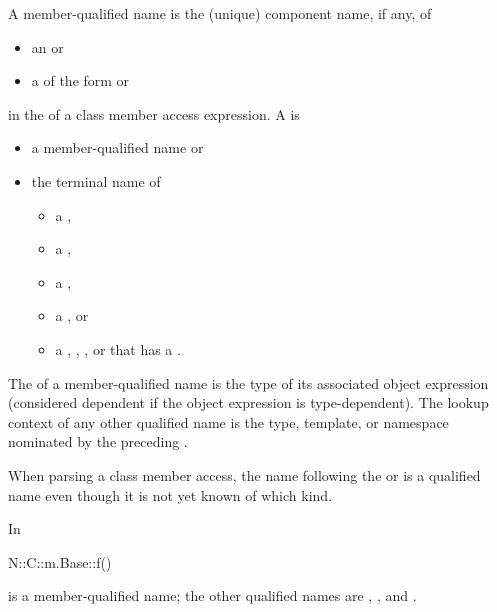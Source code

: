 \pnum
A member-qualified name is
the (unique) component name, if any, of
\begin{itemize}
\item
an  or
\item
a  of the form
 \tcode{::} or  \tcode{::}
\end{itemize}
in the  of a class member access expression.
A  is
\begin{itemize}
\item a member-qualified name or
\item the terminal name of
\begin{itemize}
\item a ,
\item a ,
\item a ,
\item a , or
\item a ,
,
, or
that has a .
\end{itemize}
\end{itemize}
The  of a member-qualified name is
the type of its associated object expression
(considered dependent if the object expression is type-dependent).
The lookup context of any other qualified name is
the type, template, or namespace
nominated by the preceding .
\begin{note}
When parsing a class member access,
the name following the \tcode{->} or  is
a qualified name even though it is not yet known of which kind.
\end{note}
\begin{example}
In
\begin{codeblock}
  N::C::m.Base::f()
\end{codeblock}
 is a member-qualified name;
the other qualified names are , , and .
\end{example}

